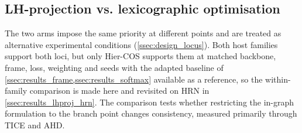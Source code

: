 \subsection{LH-projection vs. lexicographic optimisation}
\label{ssec:results_lhproj}

The two arms impose the same priority at different points and are treated as
alternative experimental conditions (\cref{ssec:design_locus}). Both host
families support both loci, but only
Hier-COS supports them at matched backbone, frame, loss, weighting and seeds
with the adapted baseline of \cref{ssec:results_frame,ssec:results_softmax}
available as a reference, so the within-family comparison is made here and
revisited on HRN in \cref{ssec:results_lhproj_hrn}.
The comparison tests whether restricting the in-graph formulation to the branch
point changes consistency, measured primarily through TICE and AHD.

